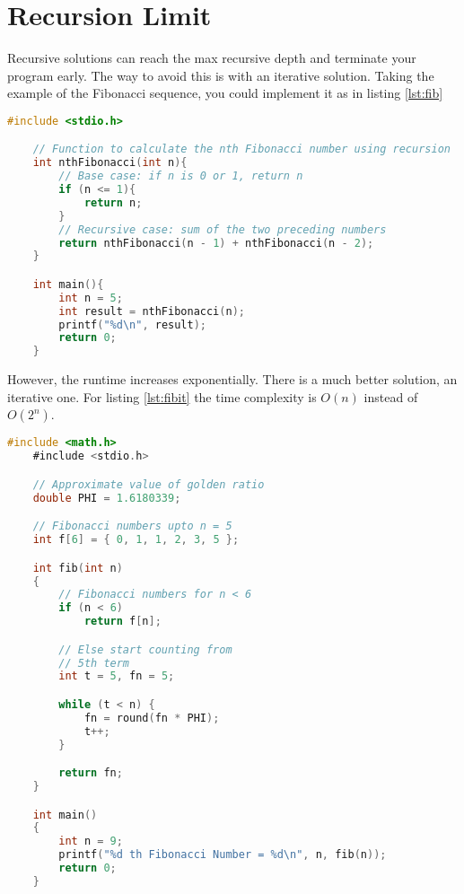 \section{Recursion Limit}

Recursive solutions can reach the max recursive depth and
terminate your program early. The way to avoid this is with
an iterative solution. Taking the example of the Fibonacci
sequence, you could implement it as in listing \ref{lst:fib}

\begin{lstlisting}[language=C, caption=Singly Linked List Node Structure]
    #include <stdio.h>

    // Function to calculate the nth Fibonacci number using recursion
    int nthFibonacci(int n){
        // Base case: if n is 0 or 1, return n
        if (n <= 1){
            return n;
        }
        // Recursive case: sum of the two preceding numbers
        return nthFibonacci(n - 1) + nthFibonacci(n - 2);
    }

    int main(){
        int n = 5;
        int result = nthFibonacci(n);
        printf("%d\n", result);
        return 0;
    }
\end{lstlisting}
\label{lst:fib}

However, the runtime increases exponentially.
There is a much better solution, an iterative one.
For listing \ref{lst:fibit} the time complexity is $O(n)$
instead of $O(2^n)$.

\begin{lstlisting}[language=C, caption=Singly Linked List Node Structure]
    #include <math.h>
    #include <stdio.h>

    // Approximate value of golden ratio
    double PHI = 1.6180339;

    // Fibonacci numbers upto n = 5
    int f[6] = { 0, 1, 1, 2, 3, 5 };

    int fib(int n)
    {
        // Fibonacci numbers for n < 6
        if (n < 6)
            return f[n];

        // Else start counting from
        // 5th term
        int t = 5, fn = 5;

        while (t < n) {
            fn = round(fn * PHI);
            t++;
        }

        return fn;
    }

    int main()
    {
        int n = 9;
        printf("%d th Fibonacci Number = %d\n", n, fib(n));
        return 0;
    }
\end{lstlisting}
\label{lst:fibit}

